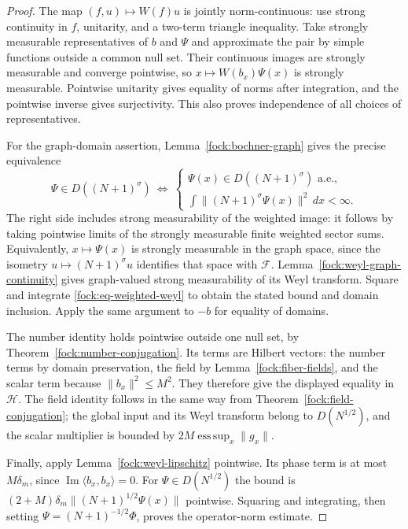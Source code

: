 \documentclass[11pt,a4paper]{article}
\theoremstyle{definition}
\theoremstyle{remark}
\begin{document}
\begin{proof}
The map $(f,u)\mapsto W(f)u$ is jointly norm-continuous: use strong
continuity in $f$, unitarity, and a two-term triangle inequality.
Take strongly measurable representatives of $b$ and $\Psi$ and
approximate the pair by simple functions outside a common null set.
Their continuous images are strongly measurable and converge pointwise,
so $x\mapsto W(b_x)\Psi(x)$ is strongly measurable. Pointwise
unitarity gives equality of norms after integration, and the
pointwise inverse gives surjectivity. This also proves independence
of all choices of representatives.

For the graph-domain assertion,
Lemma~\ref{fock:bochner-graph} gives the precise equivalence
\[
 \Psi\in D((N+1)^\sigma)
 \ \Longleftrightarrow\
 \begin{cases}
 \Psi(x)\in D((N+1)^\sigma)\text{ a.e.},\\
 \displaystyle\int\|(N+1)^\sigma\Psi(x)\|^2\,dx<\infty.
 \end{cases}
\]
The right side includes strong measurability of the weighted image:
it follows by taking pointwise limits of the strongly measurable
finite weighted sector sums. Equivalently, $x\mapsto\Psi(x)$ is
strongly measurable in the graph space, since the isometry
$u\mapsto(N+1)^\sigma u$ identifies that space with $\mathcal F$.
Lemma~\ref{fock:weyl-graph-continuity} gives graph-valued strong
measurability of its Weyl transform. Square and integrate
\eqref{fock:eq-weighted-weyl} to obtain the stated bound and domain
inclusion. Apply the same argument to $-b$ for equality of domains.

The number identity holds pointwise outside one null set, by
Theorem~\ref{fock:number-conjugation}. Its terms are Hilbert vectors:
the number terms by domain preservation, the field by
Lemma~\ref{fock:fiber-fields}, and the scalar term because
$\|b_x\|^2\leq M^2$. They therefore give the displayed equality
in $\mathcal H$. The field identity follows in the same way from
Theorem~\ref{fock:field-conjugation}; the global input and its Weyl
transform belong to $D(N^{1/2})$, and the scalar multiplier is
bounded by $2M\operatorname*{ess\,sup}_x\|g_x\|$.

Finally, apply Lemma~\ref{fock:weyl-lipschitz} pointwise.
Its phase term is at most $M\delta_m$, since
$\operatorname{Im}\langle b_x,b_x\rangle=0$.
For $\Psi\in D(N^{1/2})$ the bound is
$(2+M)\delta_m\|(N+1)^{1/2}\Psi(x)\|$ pointwise.
Squaring and integrating, then setting
$\Psi=(N+1)^{-1/2}\Phi$, proves the operator-norm estimate.
\end{proof}
\end{document}
